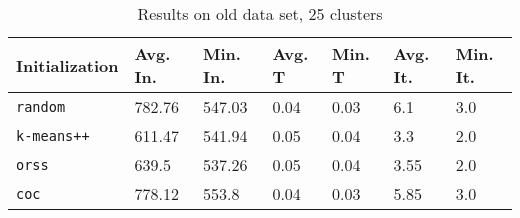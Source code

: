 \begin{table}[h]
	\begin{center}
		\begin{tabular}{|l|l|l|l|l|l|l|}
			\hline
			Initialization & Avg. In. & Min. In. & Avg. T & Min. T & Avg. It. & Min. It.\\\hline
			\texttt{random} & 782.76 & 547.03 & 0.04 & 0.03 & 6.1 & 3.0\\\hline
			\texttt{k-means++} & 611.47 & 541.94 & 0.05 & 0.04 & 3.3 & 2.0\\\hline
			\texttt{orss} & 639.5 & 537.26 & 0.05 & 0.04 & 3.55 & 2.0\\\hline
			\texttt{coc} & 778.12 & 553.8 & 0.04 & 0.03 & 5.85 & 3.0\\\hline
		\end{tabular}
		\caption{Results on old data set, 25 clusters}
		\label{tbl:old25}
	\end{center}
\end{table}

